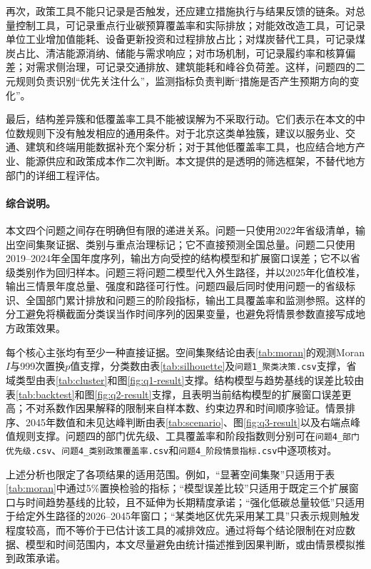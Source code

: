 \documentclass[12pt,a4paper]{ctexart}
\theoremstyle{definition}
\theoremstyle{plain}
\theoremstyle{remark}
\begin{document}
再次，政策工具不能只记录是否触发，还应建立措施执行与结果反馈的链条。对总量控制工具，可记录重点行业碳预算覆盖率和实际排放；对能效改造工具，可记录单位工业增加值能耗、设备更新投资和过程排放占比；对煤炭替代工具，可记录煤炭占比、清洁能源消纳、储能与需求响应；对市场机制，可记录履约率和核算偏差；对需求侧治理，可记录交通排放、建筑能耗和峰谷负荷差。这样，问题四的二元规则负责识别“优先关注什么”，监测指标负责判断“措施是否产生预期方向的变化”。

最后，结构差异簇和低覆盖率工具不能被误解为不采取行动。它们表示在本文的中位数规则下没有触发相应的通用条件。对于北京这类单独簇，建议以服务业、交通、建筑和终端用能数据补充个案分析；对于其他低覆盖率工具，也应结合地方产业、能源供应和政策成本作二次判断。本文提供的是透明的筛选框架，不替代地方部门的详细工程评估。
\paragraph{综合说明。}
本文四个问题之间存在明确但有限的递进关系。问题一只使用2022年省级清单，输出空间集聚证据、类别与重点治理标记；它不直接预测全国总量。问题二只使用2019--2024年全国年度序列，输出方向受控的结构模型和扩展窗口误差；它不以省级类别作为回归样本。问题三将问题二模型代入外生路径，并以2025年化值校准，输出三情景年度总量、强度和路径可行性。问题四最后同时使用问题一的省级标识、全国部门累计排放和问题三的阶段指标，输出工具覆盖率和监测参照。这样的分工避免将横截面分类误当作时间序列的因果变量，也避免将情景参数直接写成地方政策效果。

每个核心主张均有至少一种直接证据。空间集聚结论由表\ref{tab:moran}的观测Moran $I$与999次置换$p$值支撑，分类数由表\ref{tab:silhouette}及\texttt{问题1\_聚类决策.csv}支撑，省域类型由表\ref{tab:cluster}和图\ref{fig:q1-result}支撑。结构模型与趋势基线的误差比较由表\ref{tab:backtest}和图\ref{fig:q2-result}支撑，且表明当前结构模型的扩展窗口误差更高；不对系数作因果解释的限制来自样本数、约束边界和时间顺序验证。情景排序、2045年数值和未见达峰判断由表\ref{tab:scenario}、图\ref{fig:q3-result}以及右端点峰值规则支撑。问题四的部门优先级、工具覆盖率和阶段指数则分别可在\texttt{问题4\_部门优先级.csv}、\texttt{问题4\_类别政策覆盖率.csv}和\texttt{问题4\_阶段情景指标.csv}中逐项核对。

上述分析也限定了各项结果的适用范围。例如，“显著空间集聚”只适用于表\ref{tab:moran}中通过5\%置换检验的指标；“模型误差比较”只适用于既定三个扩展窗口与时间趋势基线的比较，且不延伸为长期精度承诺；“强化低碳总量较低”只适用于给定外生路径的2026--2045年窗口；“某类地区优先采用某工具”只表示规则触发程度较高，而不等价于已估计该工具的减排效应。通过将每个结论限制在对应数据、模型和时间范围内，本文尽量避免由统计描述推到因果判断，或由情景模拟推到政策承诺。
\end{document}
